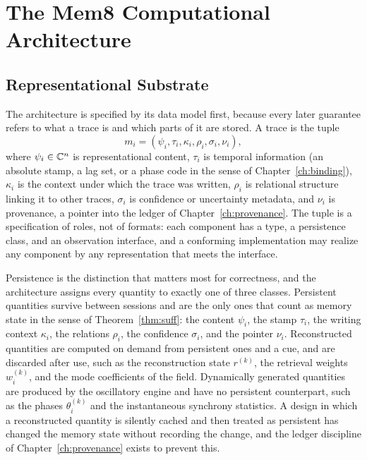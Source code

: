 \part{The Mem8 Computational Architecture}

\chapter{Representational Substrate}\label{ch:substrate}

The architecture is specified by its data model first, because every later guarantee refers to what a trace is and which parts of it are stored. A trace is the tuple
\begin{equation}\label{eq:trace}
m_i=(\psi_i,\tau_i,\kappa_i,\rho_i,\sigma_i,\nu_i),
\end{equation}
where $\psi_i\in\mathbb{C}^n$ is representational content, $\tau_i$ is temporal information (an absolute stamp, a lag set, or a phase code in the sense of Chapter~\ref{ch:binding}), $\kappa_i$ is the context under which the trace was written, $\rho_i$ is relational structure linking it to other traces, $\sigma_i$ is confidence or uncertainty metadata, and $\nu_i$ is provenance, a pointer into the ledger of Chapter~\ref{ch:provenance}. The tuple is a specification of roles, not of formats: each component has a type, a persistence class, and an observation interface, and a conforming implementation may realize any component by any representation that meets the interface.

Persistence is the distinction that matters most for correctness, and the architecture assigns every quantity to exactly one of three classes. Persistent quantities survive between sessions and are the only ones that count as memory state in the sense of Theorem~\ref{thm:suff}: the content $\psi_i$, the stamp $\tau_i$, the writing context $\kappa_i$, the relations $\rho_i$, the confidence $\sigma_i$, and the pointer $\nu_i$. Reconstructed quantities are computed on demand from persistent ones and a cue, and are discarded after use, such as the reconstruction state $r^{(k)}$, the retrieval weights $w_i^{(k)}$, and the mode coefficients of the field. Dynamically generated quantities are produced by the oscillatory engine and have no persistent counterpart, such as the phases $\theta_i^{(k)}$ and the instantaneous synchrony statistics. A design in which a reconstructed quantity is silently cached and then treated as persistent has changed the memory state without recording the change, and the ledger discipline of Chapter~\ref{ch:provenance} exists to prevent this.

